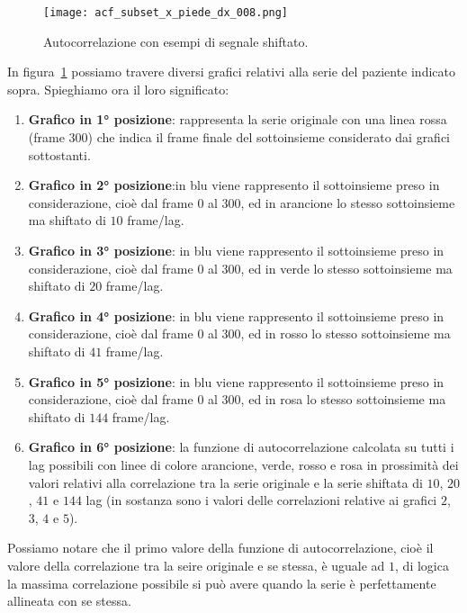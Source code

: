 \begin{figure}[H]
    \centering
    \texttt{[image: acf\_subset\_x\_piede\_dx\_008.png]}
    \caption{Autocorrelazione con esempi di segnale shiftato.}
    \label{fig:acf_subset_x_piede_dx_008}
\end{figure}
In figura~\ref{fig:acf_subset_x_piede_dx_008} possiamo travere diversi grafici relativi alla
serie del paziente indicato sopra. Spieghiamo ora il loro significato:
\begin{enumerate}
    \item \textbf{Grafico in 1° posizione}: rappresenta la serie originale con una linea rossa (frame $300$)
    che indica il frame finale del sottoinsieme considerato dai grafici sottostanti.
    \item \textbf{Grafico in 2° posizione}:in blu viene rappresento il sottoinsieme preso in considerazione,
    cioè dal frame $0$ al $300$, ed in arancione lo stesso sottoinsieme ma shiftato di $10$ frame/lag.
    \item \textbf{Grafico in 3° posizione}: in blu viene rappresento il sottoinsieme preso in considerazione,
    cioè dal frame $0$ al $300$, ed in verde lo stesso sottoinsieme ma shiftato di $20$ frame/lag.
    \item \textbf{Grafico in 4° posizione}: in blu viene rappresento il sottoinsieme preso in considerazione,
    cioè dal frame $0$ al $300$, ed in rosso lo stesso sottoinsieme ma shiftato di $41$ frame/lag.
    \item \textbf{Grafico in 5° posizione}: in blu viene rappresento il sottoinsieme preso in considerazione,
    cioè dal frame $0$ al $300$, ed in rosa lo stesso sottoinsieme ma shiftato di $144$ frame/lag.
    \item \textbf{Grafico in 6° posizione}: la funzione di autocorrelazione calcolata su tutti i 
    lag possibili con linee di colore arancione, verde, rosso e rosa in prossimità dei valori 
    relativi alla correlazione tra la serie originale e la serie shiftata di $10$, $20$,
    $41$ e $144$ lag (in sostanza sono i valori delle correlazioni relative ai grafici $2$, $3$, $4$ e $5$).
\end{enumerate}

Possiamo notare che il primo valore della funzione di autocorrelazione, cioè il valore della correlazione
tra la seire originale e se stessa, è uguale ad $1$, di logica la massima correlazione possibile si può
avere quando la serie è perfettamente allineata con se stessa.

